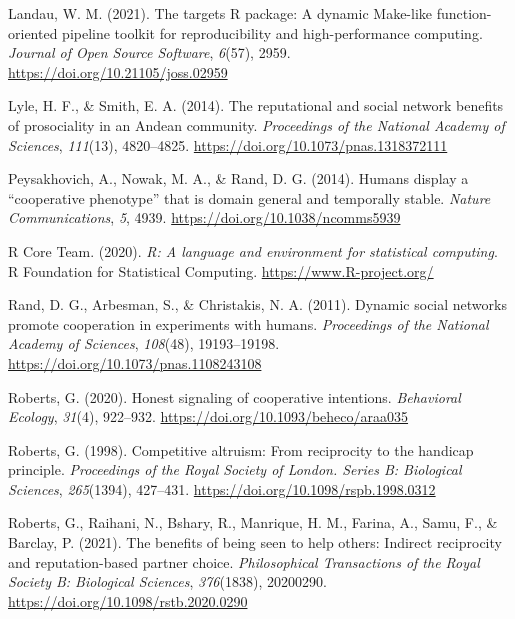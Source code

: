 \documentclass[
  man,floatsintext]{apa6}
\newlength{\cslhangindent}
\newlength{\cslentryspacingunit} %
\newenvironment{CSLReferences}[2] %
 {%
  \setlength{\parindent}{0pt}
  \ifodd #1
  \let\oldpar\par
  \def\par{\hangindent=\cslhangindent\oldpar}
  \fi
  \setlength{\parskip}{#2\cslentryspacingunit}
 }%
 {}
\begin{document}
\begin{CSLReferences}{1}{0}
\leavevmode{}%
Landau, W. M. (2021). The targets {R} package: A dynamic {Make}-like function-oriented pipeline toolkit for reproducibility and high-performance computing. \emph{Journal of Open Source Software}, \emph{6}(57), 2959. \url{https://doi.org/10.21105/joss.02959}

\leavevmode{}%
Lyle, H. F., \& Smith, E. A. (2014). The reputational and social network benefits of prosociality in an {A}ndean community. \emph{Proceedings of the National Academy of Sciences}, \emph{111}(13), 4820--4825. \url{https://doi.org/10.1073/pnas.1318372111}

\leavevmode{}%
Peysakhovich, A., Nowak, M. A., \& Rand, D. G. (2014). Humans display a {``cooperative phenotype''} that is domain general and temporally stable. \emph{Nature Communications}, \emph{5}, 4939. \url{https://doi.org/10.1038/ncomms5939}

\leavevmode{}%
R Core Team. (2020). \emph{R: A language and environment for statistical computing}. R Foundation for Statistical Computing. \url{https://www.R-project.org/}

\leavevmode{}%
Rand, D. G., Arbesman, S., \& Christakis, N. A. (2011). Dynamic social networks promote cooperation in experiments with humans. \emph{Proceedings of the National Academy of Sciences}, \emph{108}(48), 19193--19198. \url{https://doi.org/10.1073/pnas.1108243108}

\leavevmode{}%
Roberts, G. (2020). Honest signaling of cooperative intentions. \emph{Behavioral Ecology}, \emph{31}(4), 922--932. \url{https://doi.org/10.1093/beheco/araa035}

\leavevmode{}%
Roberts, G. (1998). Competitive altruism: From reciprocity to the handicap principle. \emph{Proceedings of the Royal Society of London. Series B: Biological Sciences}, \emph{265}(1394), 427--431. \url{https://doi.org/10.1098/rspb.1998.0312}

\leavevmode{}%
Roberts, G., Raihani, N., Bshary, R., Manrique, H. M., Farina, A., Samu, F., \& Barclay, P. (2021). The benefits of being seen to help others: Indirect reciprocity and reputation-based partner choice. \emph{Philosophical Transactions of the Royal Society B: Biological Sciences}, \emph{376}(1838), 20200290. \url{https://doi.org/10.1098/rstb.2020.0290}


\end{CSLReferences}
\end{document}
